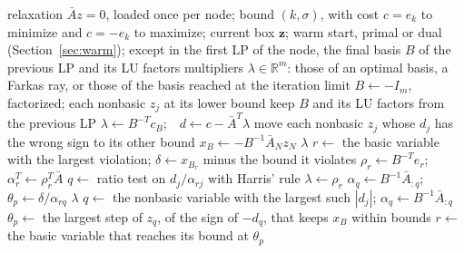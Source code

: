 \documentclass[11pt]{article}
\newcommand{\iv}[1]{\mathbf{#1}}          %
\newcommand{\R}{\mathbb{R}}
\newcommand{\Abar}{\bar{A}}
\theoremstyle{definition}
\theoremstyle{remark}
\begin{document}
\begin{algorithm}[!tp]
\caption{\textsc{Solve} in SC: one LP of the pass. Comments marked $\star$ point to the work a general-purpose solver does
differently.}\label{alg:sc}
\begin{algorithmic}[1]
\Require relaxation $\Abar z=0$, loaded once per node; bound $(k,\sigma)$, with
  cost $c=e_k$ to minimize and $c=-e_k$ to maximize; current box $\iv{z}$; warm
  start, primal or dual (Section~\ref{sec:warm}); except in the first LP of the
  node, the final basis $B$ of the previous LP and its LU factors
\Ensure multipliers $\lambda\in\R^m$: those of an optimal basis, a Farkas ray,
  or those of the basis reached at the iteration limit
  \State $B\gets -I_m$, factorized; each nonbasic $z_j$ at its lower bound
    \label{as:slack}
\Else
  \State keep $B$ and its LU factors from the previous LP
    \label{as:keep}
\EndIf
\State $\lambda\gets B^{-T}c_B$;\ \ $d\gets c-\Abar^T\lambda$
  \label{as:lam}
  \State move each nonbasic $z_j$ whose $d_j$ has the wrong sign to its other bound\label{as:reloc}
\EndIf
\State $x_B\gets -B^{-1}\Abar_N z_N$
  \label{as:xb}
\label{as:loop}
    \label{as:dual}
     \Return $\lambda$
      \label{as:opt}
    \EndIf
    \State $r\gets$ the basic variable with the largest violation;
      $\delta\gets x_{B_r}$ minus the bound it violates
    \State $\rho_r\gets B^{-T}e_r$;\ \ $\alpha_r^T\gets\rho_r^T\Abar$
    \State $q\gets$ ratio test on $d_j/\alpha_{rj}$ with Harris' rule
     \Return $\lambda\gets\rho_r$
      \label{as:ray}
    \EndIf
    \State $\alpha_q\gets B^{-1}\Abar_{:q}$;\ \ $\theta_p\gets\delta/\alpha_{rq}$\label{as:dualend}
  \Else {}\label{as:primal}
     \Return $\lambda$ 
    \EndIf
    \State $q\gets$ the nonbasic variable with the largest such $|d_j|$;
      $\alpha_q\gets B^{-1}\Abar_{:q}$
    \State $\theta_p\gets$ the largest step of $z_q$, of the sign of $-d_q$, that keeps
      $x_B$ within bounds
    \State $r\gets$ the basic variable that reaches its bound at $\theta_p$

\end{algorithmic}
\end{algorithm}
\end{document}
